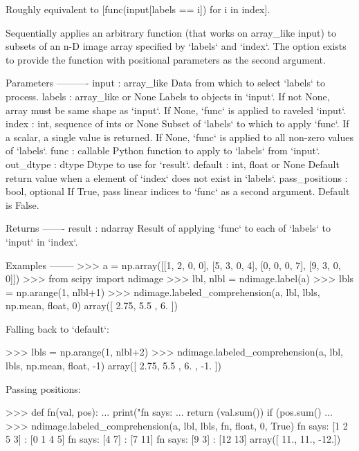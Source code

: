 \begin{DoxyVerb}Roughly equivalent to [func(input[labels == i]) for i in index].

Sequentially applies an arbitrary function (that works on array_like input)
to subsets of an n-D image array specified by `labels` and `index`.
The option exists to provide the function with positional parameters as the
second argument.

Parameters
----------
input : array_like
    Data from which to select `labels` to process.
labels : array_like or None
    Labels to objects in `input`.
    If not None, array must be same shape as `input`.
    If None, `func` is applied to raveled `input`.
index : int, sequence of ints or None
    Subset of `labels` to which to apply `func`.
    If a scalar, a single value is returned.
    If None, `func` is applied to all non-zero values of `labels`.
func : callable
    Python function to apply to `labels` from `input`.
out_dtype : dtype
    Dtype to use for `result`.
default : int, float or None
    Default return value when a element of `index` does not exist
    in `labels`.
pass_positions : bool, optional
    If True, pass linear indices to `func` as a second argument.
    Default is False.

Returns
-------
result : ndarray
    Result of applying `func` to each of `labels` to `input` in `index`.

Examples
--------
>>> a = np.array([[1, 2, 0, 0],
                  [5, 3, 0, 4],
                  [0, 0, 0, 7],
                  [9, 3, 0, 0]])
>>> from scipy import ndimage
>>> lbl, nlbl = ndimage.label(a)
>>> lbls = np.arange(1, nlbl+1)
>>> ndimage.labeled_comprehension(a, lbl, lbls, np.mean, float, 0)
array([ 2.75,  5.5 ,  6.  ])

Falling back to `default`:

>>> lbls = np.arange(1, nlbl+2)
>>> ndimage.labeled_comprehension(a, lbl, lbls, np.mean, float, -1)
array([ 2.75,  5.5 ,  6.  , -1.  ])

Passing positions:

>>> def fn(val, pos):
...     print("fn says: %
...     return (val.sum()) if (pos.sum() %
...
>>> ndimage.labeled_comprehension(a, lbl, lbls, fn, float, 0, True)
fn says: [1 2 5 3] : [0 1 4 5]
fn says: [4 7] : [7 11]
fn says: [9 3] : [12 13]
array([ 11.,  11., -12.])\end{DoxyVerb}
 \hypertarget{namespacescipy_1_1ndimage_1_1measurements_a79e4232e0da6dbfd60a61c84fad65dcb}{}
